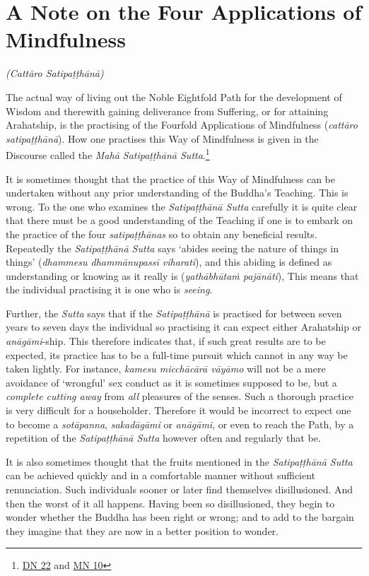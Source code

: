\chapter{A Note on the Four Applications of Mindfulness}

\textit{(Cattāro Satipaṭṭhānā)}

\protect\hypertarget{start}{}{}The actual way of living out the Noble Eightfold Path for the development of Wisdom and therewith gaining deliverance from Suffering, or for attaining Arahatship, is the practising of the Fourfold Applications of Mindfulness (\textit{cattāro satipaṭṭhānā}). How one practises this Way of Mindfulness is given in the Discourse called the \textit{Mahā Satipaṭṭhānā Sutta}.\footnote{\href{https://suttacentral.net/dn22/en/sujato}{DN 22} and \href{https://suttacentral.net/mn10/en/sujato}{MN 10}}

It is sometimes thought that the practice of this Way of Mindfulness can be undertaken without any prior understanding of the Buddha's Teaching. This is wrong. To the one who examines the \textit{Satipaṭṭhānā Sutta} carefully it is quite clear that there must be a good understanding of the Teaching if one is to embark on the practice of the four \textit{satipaṭṭhānas} so to obtain any beneficial results. Repeatedly the \textit{Satipaṭṭhānā Sutta} says `abides seeing the nature of things in things' (\textit{dhammesu dhammānupassī viharati}), and this abiding is defined as understanding or knowing as it really is (\textit{yathābhūtaṁ pajānāti}), This means that the individual practising it is one who is \emph{seeing}.

Further, the \textit{Sutta} says that if the \textit{Satipaṭṭhānā} is practised for between seven years to seven days the individual so practising it can expect either Arahatship or \textit{anāgāmi}-ship. This therefore indicates that, if such great results are to be expected, its practice has to be a full-time pursuit which cannot in any way be taken lightly. For instance, \textit{kamesu micchācārā vāyāmo} will not be a mere avoidance of `wrongful' sex conduct as it is sometimes supposed to be, but a \emph{complete cutting away} from \emph{all} pleasures of the senses. Such a thorough practice is very difficult for a householder. Therefore it would be incorrect to expect one to become a \textit{sotāpanna}, \textit{sakadāgāmi} or \textit{anāgāmi}, or even to reach the Path, by a repetition of the \textit{Satipaṭṭhānā Sutta} however often and regularly that be.

It is also sometimes thought that the fruits mentioned in the \textit{Satipaṭṭhānā Sutta} can be achieved quickly and in a comfortable manner without sufficient renunciation. Such individuals sooner or later find themselves disillusioned. And then the worst of it all happens. Having been so disillusioned, they begin to wonder whether the Buddha has been right or wrong; and to add to the bargain they imagine that they are now in a better position to wonder.

